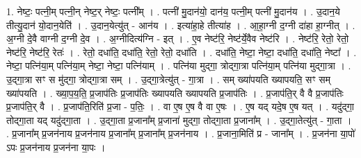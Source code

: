 \documentclass[17pt]{extarticle}
\begin{document}
1. नेष्टः॒ पत्नी॒म् पत्नी॒न् नेष्ट॒र् नेष्टः॒ पत्नी᳚म् । . पत्नी॑ मु॒दान॑यो॒ दान॑य॒ पत्नी॒म् पत्नी॑ मु॒दान॑य । . उ॒दान॒ये तीत्यु॒दान॑ यो॒दान॒येति॑ । . उ॒दान॒येत्यु॑त् - आन॑य । . इत्या॑हा॒हे तीत्या॑ह । . आ॒हा॒ग्नी द॒ग्नी दा॑हा हा॒ग्नीत् । . अ॒ग्नी दे॒वै वाग्नी द॒ग्नी दे॒व । . अ॒ग्नीदित्य॑ग्नि - इत् । . ए॒व नेष्ट॑रि॒ नेष्ट॑र्ये॒वैव नेष्ट॑रि । . नेष्ट॑रि॒ रेतो॒ रेतो॒ नेष्ट॑रि॒ नेष्ट॑रि॒ रेतः॑ । . रेतो॒ दधा॑ति॒ दधा॑ति॒ रेतो॒ रेतो॒ दधा॑ति । . दधा॑ति॒ नेष्टा॒ नेष्टा॒ दधा॑ति॒ दधा॑ति॒ नेष्टा᳚ । . नेष्टा॒ पत्नि॑या॒म् पत्नि॑या॒म् नेष्टा॒ नेष्टा॒ पत्नि॑याम् । . पत्नि॑या मुद्‌गा॒ त्रोद्‌गा॒त्रा पत्नि॑या॒म् पत्नि॑या मुद्‌गा॒त्रा । . उ॒द्‌गा॒त्रा सꣳ स मु॑द्‌गा॒ त्रोद्‌गा॒त्रा सम् । . उ॒द्‌गा॒त्रेत्यु॑त् - गा॒त्रा । . सम् ख्या॑पयति ख्यापयति॒ सꣳ सम् ख्या॑पयति । . ख्या॒प॒य॒ति॒ प्र॒जाप॑तिः प्र॒जाप॑तिः ख्यापयति ख्यापयति प्र॒जाप॑तिः । . प्र॒जाप॑ति॒र् वै वै प्र॒जाप॑तिः प्र॒जाप॑ति॒र् वै । . प्र॒जाप॑ति॒रिति॑ प्र॒जा - प॒तिः॒ । . वा ए॒ष ए॒ष वै वा ए॒षः । . ए॒ष यद् यदे॒ष ए॒ष यत् । . यदु॑द्‌गा॒ तोद्‌गा॒ता यद् यदु॑द्‌गा॒ता । . उ॒द्‌गा॒ता प्र॒जाना᳚म् प्र॒जाना॑ मुद्‌गा॒ तोद्‌गा॒ता प्र॒जाना᳚म् । . उ॒द्‌गा॒तेत्यु॑त् - गा॒ता । . प्र॒जाना᳚म् प्र॒जन॑नाय प्र॒जन॑नाय प्र॒जाना᳚म् प्र॒जाना᳚म् प्र॒जन॑नाय । . प्र॒जाना॒मिति॑ प्र - जाना᳚म् । . प्र॒जन॑ना या॒पो॑ ऽपः प्र॒जन॑नाय प्र॒जन॑ना या॒पः । \newline
\end{document}
